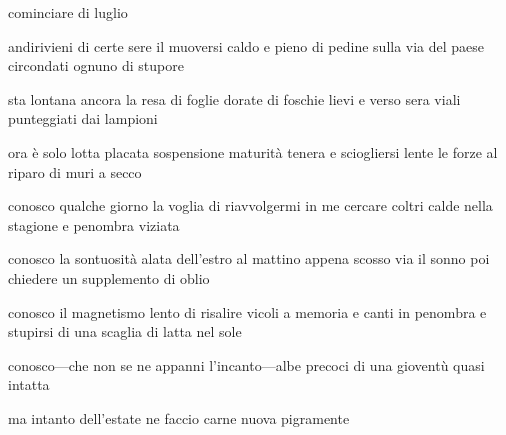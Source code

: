 \begin{poem}
	\begin{stanza}
		cominciare di luglio
	\end{stanza}

	\begin{stanza}
		andirivieni di certe sere\verseline
		il muoversi caldo e pieno\verseline
		di pedine sulla via del paese\verseline
		circondati ognuno di stupore
	\end{stanza}

	\begin{stanza}
		sta lontana ancora la resa\verseline
		di foglie dorate\verseline
		di foschie lievi e verso sera\verseline
		viali punteggiati dai lampioni
	\end{stanza}

	\begin{stanza}
		ora è solo lotta placata\verseline
		sospensione\verseline
		maturità tenera\verseline
		e sciogliersi lente le forze\verseline
		al riparo di muri a secco
	\end{stanza}
\end{poem}

\clearpage


\begin{poem}
	\begin{stanza}
		conosco qualche giorno\verseline
		la voglia di riavvolgermi in me\verseline
		cercare coltri calde nella stagione\verseline
		e penombra viziata
	\end{stanza}

	\begin{stanza}
		conosco la sontuosità alata\verseline
		dell'estro al mattino\verseline
		appena scosso via il sonno\verseline
		poi chiedere un supplemento di oblio
	\end{stanza}

	\begin{stanza}
		conosco il magnetismo lento\verseline
		di risalire vicoli a memoria\verseline
		e canti in penombra e stupirsi\verseline
		di una scaglia di latta nel sole
	\end{stanza}

	\begin{stanza}
		conosco—che non se ne appanni\verseline
		l’incanto—albe precoci\verseline
		di una gioventù quasi intatta
	\end{stanza}

	\begin{stanza}
		ma intanto\verseline
		dell’estate\verseline
		ne faccio carne nuova
		pigramente
	\end{stanza}
\end{poem}

